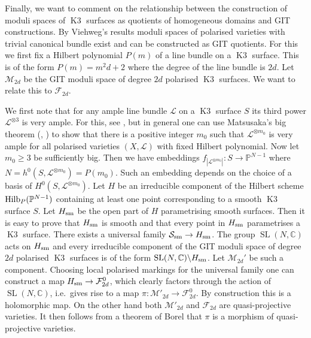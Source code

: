 \documentclass[a4paper,11pt]{article}
\newcommand{\CC}{\mathbb C}
\newcommand{\PP}{\mathbb P}
\newcommand{\cF}{\mathcal F}
\renewcommand{\cL}{\mathcal L}
\newcommand{\cM}{\mathcal M}
\newcommand{\cS}{\mathcal S}
\newcommand{\SL}{\mathop{\mathrm {SL}}\nolimits}
\newcommand{\sm}{\mathop{\null\mathrm {sm}}\nolimits}
\newcommand{\Hilb}{\mathop{\null\mathrm {Hilb}}\nolimits}
\newcommand{\Kthree}{\mathop{\mathrm {K3}}\nolimits}
\begin{document}
Finally, we want to comment on the relationship between the
construction of moduli spaces of $\Kthree$ surfaces as quotients of
homogeneous domains and GIT constructions.  By Viehweg's results
\cite{Vi} moduli spaces of polarised varieties with trivial canonical
bundle exist and can be constructed as GIT quotients. For this we
first fix a Hilbert polynomial $P(m)$ of a line bundle on a $\Kthree$
surface.  This is of the form $P(m)=m^2d +2$ where the degree of the
line bundle is $2d$.  Let $\cM_{2d}$ be the GIT moduli space of degree
$2d$ polarised $\Kthree$ surfaces. We want to relate this to
$\cF_{2d}$.

We first note that for any ample line bundle $\cL$ on a $\Kthree$
surface $S$ its third power $\cL^{\otimes 3}$ is very ample. For this,
see \cite{S-D}, but in general one can use Matsusaka's big theorem
(\cite{Mat}, \cite{LM}) to show that there is a positive integer $m_0$
such that $\cL^{\otimes m_0}$ is very ample for all polarised
varieties $(X,\cL)$ with fixed Hilbert polynomial.  Now let $m_0 \ge
3$ be sufficiently big.  Then we have embeddings $f_{|\cL^{\otimes
    m_0}|}\colon S \to \PP^{N-1}$ where $N=h^0(S,\cL^{\otimes
  m_0})=P(m_0)$.  Such an embedding depends on the choice of a basis
of $H^0(S,\cL^{\otimes m_0})$. Let $H$ be an irreducible component of
the Hilbert scheme $\Hilb_P(\PP^{N-1})$ containing at least one point
corresponding to a smooth $\Kthree$ surface $S$.  Let $H_{\sm}$ be the
open part of $H$ parametrising smooth surfaces. Then it is easy to
prove that $H_{\sm}$ is smooth and that every point in $H_{\sm}$
parametrises a $\Kthree$ surface.  There exists a universal family
$\cS_{\sm} \to H_{\sm}$.  The group $\SL(N,\CC)$ acts on $H_{\sm}$ and
every irreducible component of the GIT moduli space of degree $2d$
polarised $\Kthree$ surfaces is of the form $\SL(N,\CC) \backslash
H_{\sm}$. Let $\cM_{2d}'$ be such a component.  Choosing local
polarised markings for the universal family one can construct a map
$H_{\sm} \to \cF^0_{2d}$, which clearly factors through the action of
$\SL(N,\CC) $, i.e.\ gives rise to a map $\pi\colon \cM'_{2d} \to
\cF^0_{2d}$. By construction this is a holomorphic map.  On the other
hand both $\cM'_{2d}$ and $\cF_{2d}$ are quasi-projective varieties.
It then follows from a theorem of Borel \cite{Bl2} that $\pi$ is a
morphism of quasi-projective varieties.
\end{document}
